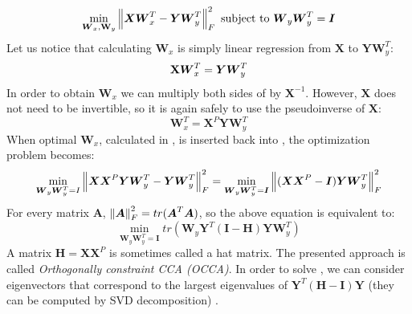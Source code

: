 \begin{equation}\label{eq:cplst1}
    \min_{\boldsymbol{W}_x, \bold{W}_y} \left\lVert\boldsymbol{X}\boldsymbol{W}_x^T-\boldsymbol{Y}\boldsymbol{W}_y^T\right\rVert_{F}^2  
    \text{  subject to   } \boldsymbol{W}_y\boldsymbol{W}_y^T=\boldsymbol{I}   
\end{equation}
Let us notice that calculating $\boldsymbol{W}_x$ is simply linear regression from $\boldsymbol{X}$ to $\boldsymbol{Y}\boldsymbol{W}_y^T$:
\begin{equation}\label{eq:cplst2}
    \bold{X}\boldsymbol{W}_x^T=\boldsymbol{Y}\boldsymbol{W}_y^T \\
\end{equation}
In order to obtain $\boldsymbol{W}_x$ we can multiply both sides of  by $\boldsymbol{X}^{-1}$. However, $\boldsymbol{X}$ does not need to be invertible, so it is again safely to use the pseudoinverse of $\boldsymbol{X}$: 
\begin{equation}\label{eq:cplst2_inv}
    \boldsymbol{W}_x^T=\boldsymbol{X}^P\boldsymbol{Y}\boldsymbol{W}_y^T
\end{equation}
When optimal $\boldsymbol{W}_x$, calculated in , is inserted back into , the optimization problem becomes:
\begin{equation}\label{eq:cplst3}
    \min_{\boldsymbol{W}_y\boldsymbol{W}_y^T=I} \left\lVert\boldsymbol{X}\boldsymbol{X}^P\boldsymbol{Y}\boldsymbol{W}_y^T-\boldsymbol{Y}\boldsymbol{W}_y^T\right\rVert_{F}^2=\min_{\boldsymbol{W}_y\boldsymbol{W}_y^T=\boldsymbol{I}} \left\lVert(\boldsymbol{X}\boldsymbol{X}^P-\boldsymbol{I})\boldsymbol{Y}\boldsymbol{W}_y^T\right\rVert_{F}^2
\end{equation}
For every matrix $\boldsymbol{A}$, $\left\lVert\boldsymbol{A}\right\rVert_{F}^2=tr(\boldsymbol{A}^T\boldsymbol{A})$, so the above equation is equivalent to:
\begin{equation}\label{eq:cplst4}
    \min_{\boldsymbol{W}_y\boldsymbol{W}_y^T=\boldsymbol{I}} tr(\boldsymbol{W}_y\boldsymbol{Y}^T(\boldsymbol{I}-\boldsymbol{H})\boldsymbol{Y}\boldsymbol{W}_y^T)
\end{equation}
A matrix $\boldsymbol{H}=\boldsymbol{X}\boldsymbol{X}^P$ is sometimes called a hat matrix. The presented approach is called \textit{Orthogonally constraint CCA (OCCA)}. In order to solve , we can consider eigenvectors that correspond to the largest eigenvalues of $\boldsymbol{Y}^T(\boldsymbol{H}-\boldsymbol{I})\boldsymbol{Y}$ (they can be computed by SVD decomposition) \citep{ChenLin}.

